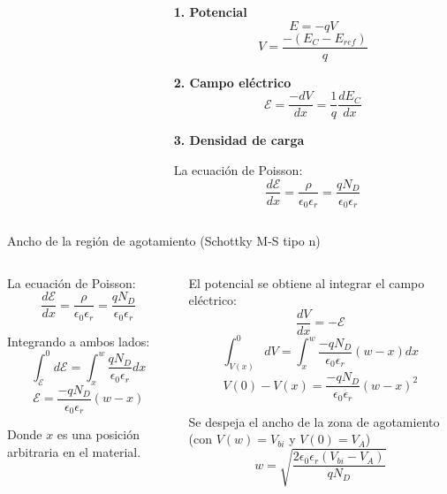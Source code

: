 \documentclass[10pt,t,aspectratio=169]{beamer}
\begin{document}
\begin{frame}[t]
\begin{columns}
\begin{column}{0.18\textwidth}
\end{column}
\begin{column}{0.32\textwidth}

\textbf{1. Potencial}
%
\[ E = -q V \]
%
\[ V = \dfrac{-(E_C - E_{ref})}{q} \]

\textbf{2. Campo eléctrico}
%
\[ \mathcal{E} = \dfrac{-dV}{dx} = \dfrac{1}{q} \dfrac{dE_C}{dx} \]

\textbf{3. Densidad de carga}

La ecuación de Poisson:
%
\[ \dfrac{d\mathcal{E}}{dx} = \dfrac{\rho}{\epsilon_0 \epsilon_r} = \dfrac{q N_D}{\epsilon_0 \epsilon_r} \]

\end{column}
\end{columns}

\end{frame}


\begin{frame}{Ancho de la región de agotamiento (Schottky M-S tipo n)}

\begin{columns}

\begin{column}{0.5\textwidth}

La ecuación de Poisson:
\[ \dfrac{d\mathcal{E}}{dx} = \dfrac{\rho}{\epsilon_0 \epsilon_r} = \dfrac{q N_D}{\epsilon_0 \epsilon_r} \]

Integrando a ambos lados:
\[ \int_{\mathcal{E}}^{0} d\mathcal{E} = \int_x^w \dfrac{q N_D}{\epsilon_0 \epsilon_r} dx \]
\[ \mathcal{E} = \dfrac{-q N_D}{\epsilon_0 \epsilon_r} (w - x) \]

Donde $x$ es una posición arbitraria en el material.

\end{column}

\begin{column}{0.5\textwidth}

El potencial se obtiene al integrar el campo eléctrico:
\[ \dfrac{dV}{dx} = -\mathcal{E} \]
\[ \int_{V(x)}^{0} dV = \int_x^w \dfrac{-q N_D}{\epsilon_0 \epsilon_r} (w - x) dx \]
\[ V(0) - V(x) = \dfrac{-q N_D}{\epsilon_0 \epsilon_r} (w - x)^2 \]

Se despeja el ancho de la zona de agotamiento (con $V(w) = V_{bi}$ y $V(0) = V_A$)
\[ \boxed{w = \sqrt{\dfrac{2 \epsilon_0 \epsilon_r (V_{bi} - V_A)}{q N_D}}} \]

\end{column}

\end{columns}

\end{frame}
\end{document}
